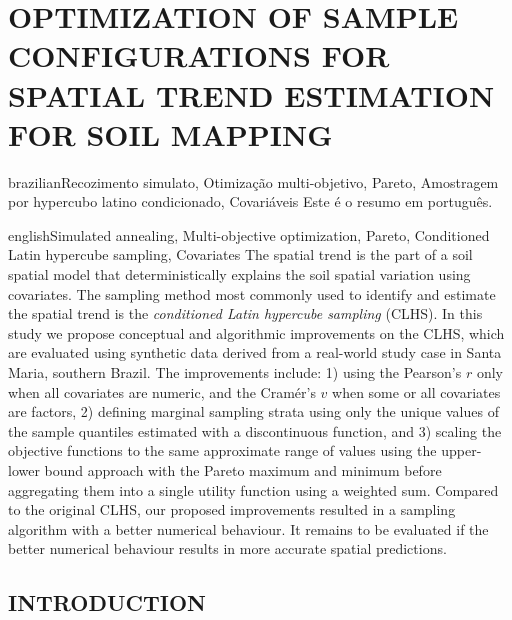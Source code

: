\artigotrue
\chapter{OPTIMIZATION OF SAMPLE CONFIGURATIONS FOR SPATIAL TREND ESTIMATION FOR SOIL MAPPING}
\label{chap:chap07}

\def\ptkeys{Recozimento simulato, Otimização multi-objetivo, Pareto, Amostragem por hypercubo latino 
condicionado, Covariáveis}

\begin{chapterabstract}{brazilian}{\ptkeys}
Este é o resumo em português.
\end{chapterabstract}

\def\enkeys{Simulated annealing, Multi-objective optimization, Pareto, Conditioned Latin hypercube sampling, 
Covariates}
  
\begin{chapterabstract}{english}{\enkeys}
The spatial trend is the part of a soil spatial model that deterministically explains the soil spatial 
variation using covariates. The sampling method most commonly used to identify and estimate the spatial trend 
is the \emph{conditioned Latin hypercube sampling} (CLHS). In this study we propose conceptual and algorithmic 
improvements on the CLHS, which are evaluated using synthetic data derived from a real-world study case in 
Santa Maria, southern Brazil. The improvements include: 1) using the Pearson's $r$ only when all covariates 
are numeric, and the Cramér's $v$ when some or all covariates are factors, 2) defining marginal sampling 
strata using only the unique values of the sample quantiles estimated with a discontinuous function, and 3) 
scaling the objective functions to the same approximate range of values using the upper-lower bound approach 
with the Pareto maximum and minimum before aggregating them into a single utility function using a weighted 
sum. Compared to the original CLHS, our proposed improvements resulted in a sampling algorithm with a better 
numerical behaviour. It remains to be evaluated if the better numerical behaviour results in more accurate 
spatial predictions.
\end{chapterabstract}

\formatchapter

\section{INTRODUCTION}
\label{sec:chap07-intro}



